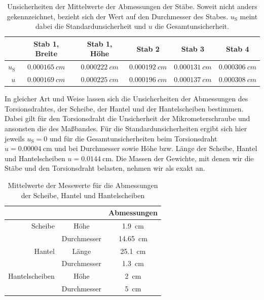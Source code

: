 \documentclass[
	a4paper,
	12pt,
	pagesize,
	ngerman
]{scrartcl}
\begin{document}
	\begin{table}[tb]
		\centering
		\begin{tabular}{ r | c | c | c | c | c |} 
			& Stab 1, Breite & Stab 1, Höhe  & Stab 2 & Stab 3 &  Stab 4 \\ \hline
			$ u_\text{S} $  & $\SI{0,000165}{cm}$ &  $\SI{0,000222}{cm}$ &  $\SI{0,000192}{cm}$ &  $\SI{0,000131}{cm}$ & $\SI{0,000306}{cm}$  \\ \hline
			$ u $ & $\SI{0,000169}{cm}$ & $\SI{0,000225}{cm}$ & $\SI{0,000196}{cm}$ & $\SI{0,000137}{cm}$ & $\SI{0,000308}{cm}$ \\ \hline
		\end{tabular}
		\caption{Unsicherheiten der Mittelwerte der Abmessungen der Stäbe. Soweit nicht anders gekennzeichnet, bezieht sich der Wert auf den Durchmesser des Stabes. $ u_\text{S} $ meint dabei die Standardunsicherheit und $ u $ die Gesamtunsicherheit.}
		\label{Stäbe_Abmesungen_Unsicherheiten}
	\end{table}
	In gleicher Art und Weise lassen sich die Unsicherheiten der Abmessungen des Torsionsdrahtes, der Scheibe, der Hantel und der Hantelscheiben bestimmen. Dabei gilt für den Torsionsdraht die Unsicherheit der Mikrometerschraube und ansonsten die des Maßbandes. Für die Standardunsicherheiten ergibt sich hier jeweils $u_\text{S}=0 $ und für die Gesamtunsicherheiten beim Torsionsdraht $ u=  \SI{0,00004}{\centi \meter}$ und bei Durchmesser sowie Höhe bzw. Länge der Scheibe, Hantel und Hantelscheiben $ u= \SI{0,0144}{\centi \meter}$.
	Die Massen der Gewichte, mit denen wir die Stäbe und den Torsionsdraht belasten, nehmen wir als exakt an.
	
	\begin{table}[tb]
		\centering
		\begin{tabular}{ r | c | c |} 
			& & Abmessungen\\ \hline
			Scheibe & Höhe & \SI{1,9}{\centi \meter }\\
			& Durchmesser & \SI{14,65}{\centi \meter }\\ \hline
			Hantel & Länge & \SI{25,1}{\centi \meter }\\
			& Durchmesser & \SI{1,3}{\centi \meter }\\ \hline
			Hantelscheiben & Höhe & \SI{2}{\centi \meter } \\
			& Durchmesser & \SI{5}{\centi \meter }\\ \hline
		\end{tabular}
		\caption{Mittelwerte der Messwerte für die Abmessungen der Scheibe, Hantel und Hantelscheiben}
		\label{Abmessungen_Scheiben}
	\end{table}
\end{document}
